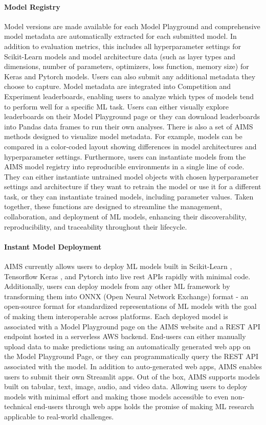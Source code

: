\paragraph{Model Registry} Model versions are made available for each Model Playground and comprehensive model metadata are automatically extracted for each submitted model. In addition to evaluation metrics, this includes all hyperparameter settings for Scikit-Learn models and model architecture data (such as layer types and dimensions, number of parameters, optimizers, loss function, memory size) for Keras and Pytorch models. Users can also submit any additional metadata they choose to capture. Model metadata are integrated into Competition and Experiment leaderboards, enabling users to analyze which types of models tend to perform well for a specific ML task. Users can either visually explore leaderboards on their Model Playground page or they can download leaderboards into Pandas data frames to run their own analyses. There is also a set of AIMS methods designed to visualize model metadata. For example, models can be compared in a color-coded layout showing differences in model architectures and hyperparameter settings. Furthermore, users can instantiate models from the AIMS model registry into reproducible environments in a single line of code. They can either instantiate untrained model objects with chosen hyperparameter settings and architecture if they want to retrain the model or use it for a different task, or they can instantiate trained models, including parameter values. Taken together, these functions are designed to streamline the management, collaboration, and deployment of ML models, enhancing their discoverability, reproducibility, and traceability throughout their lifecycle.

\paragraph{Instant Model Deployment} AIMS currently allows users to deploy ML models built in Scikit-Learn \citep{pedregosa_scikit-learn:_2011}, Tensorflow Keras \citep{abadi_tensorflow_2016, chollet_keras_2015}, and Pytorch \citep{paszke_pytorch_2019} into live rest APIs rapidly with minimal code. Additionally, users can deploy models from any other ML framework by transforming them into ONNX (Open Neural Network Exchange) format - an open-source format for standardized representations of ML models with the goal of making them interoperable across platforms. Each deployed model is associated with a Model Playground page on the AIMS website and a REST API endpoint hosted in a serverless AWS backend. End-users can either manually upload data to make predictions using an automatically generated web app on the Model Playground Page, or they can programmatically query the REST API associated with the model. In addition to auto-generated web apps, AIMS enables users to submit their own Streamlit apps. Out of the box, AIMS supports models built on tabular, text, image, audio, and video data. Allowing users to deploy models with minimal effort and making those models accessible to even non-technical end-users through web apps holds the promise of making ML research applicable to real-world challenges.



